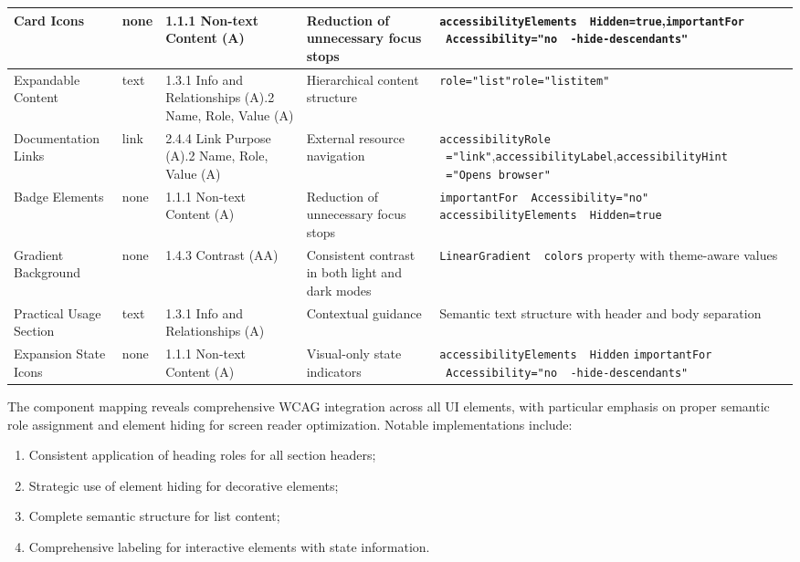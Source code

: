 \begin{longtable}[c]{|C{2.8cm}|C{2cm}|C{2.8cm}|C{2.8cm}|C{4.8cm}|}
\hline
Card Icons & none & 1.1.1 Non-text Content (A) & Reduction of unnecessary focus stops & \texttt{accessibilityElements \ Hidden=true},\newline \texttt{importantFor \ Accessibility="no \ -hide-descendants"} \\
\hline
Expandable Content & text & 1.3.1 Info and Relationships (A).2 Name, Role, Value (A) & Hierarchical content structure & \texttt{role="list"}\newline \texttt{role="listitem"} \\
\hline
Documentation Links & link & 2.4.4 Link Purpose (A).2 Name, Role, Value (A) & External resource navigation & \texttt{accessibilityRole \ ="link"},\newline \texttt{accessibilityLabel},\newline \texttt{accessibilityHint \ ="Opens browser"} \\
\hline
Badge Elements & none & 1.1.1 Non-text Content (A) & Reduction of unnecessary focus stops & \texttt{importantFor \ Accessibility="no"} \newline \texttt{accessibilityElements \ Hidden=true} \\
\hline
Gradient Background & none & 1.4.3 Contrast (AA) & Consistent contrast in both light and dark modes & \texttt{LinearGradient \ colors} property with theme-aware values \\
\hline
Practical Usage Section & text & 1.3.1 Info and Relationships (A) & Contextual guidance & Semantic text structure with header and body separation \\
\hline
Expansion State Icons & none & 1.1.1 Non-text Content (A) & Visual-only state indicators & \texttt{accessibilityElements \ Hidden} \newline \texttt{importantFor \ Accessibility="no \ -hide-descendants"} \\
\end{longtable}
\FloatBarrier

The component mapping reveals comprehensive WCAG integration across all UI elements, with particular emphasis on proper semantic role assignment and element hiding for screen reader optimization. Notable implementations include:

\begin{enumerate}
    \item Consistent application of heading roles for all section headers;
    
    \item Strategic use of element hiding for decorative elements;
    
    \item Complete semantic structure for list content;
    
    \item Comprehensive labeling for interactive elements with state information.
\end{enumerate}

